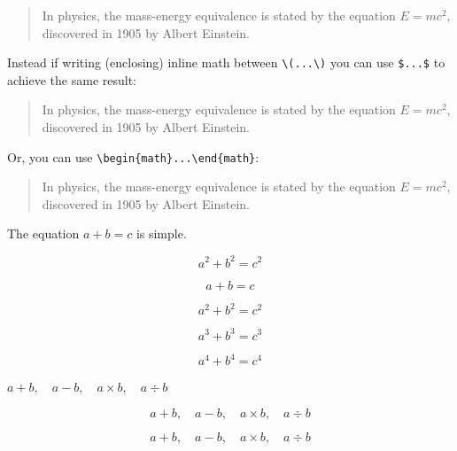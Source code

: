 \documentclass[12pt, letterpaper]{article}
\begin{document}
\begin{quote}
In physics, the mass-energy equivalence is stated 
by the equation \(E=mc^2\), discovered in 1905 by Albert Einstein.
\end{quote}

\noindent Instead if writing (enclosing) inline math between \verb|\(...\)| you can use \texttt{\$...\$} to achieve the same result:

\begin{quote}
In physics, the mass-energy equivalence is stated 
by the equation $E=mc^2$, discovered in 1905 by Albert Einstein.
\end{quote}

\noindent Or, you can use \verb|\begin{math}...\end{math}|:

\begin{quote}
In physics, the mass-energy equivalence is stated 
by the equation \begin{math}E=mc^2\end{math}, discovered in 1905 by Albert Einstein.
\end{quote}








\newpage

The equation $a + b = c$ is simple.

\[ a^2 + b^2 = c^2\]


\begin{equation}
	a + b = c
\end{equation}

\begin{equation}
a^2 + b^2 = c^2
\end{equation}

\begin{equation}
	a^3 + b^3 = c^3
\end{equation}

\begin{equation}
a^4 + b^4 = c^4
\end{equation}

$
a + b,\quad a - b,\quad a \times b,\quad a \div b
$


\[
a + b,\quad a - b,\quad a \times b,\quad a \div b
\]


\[
a + b,\quad 
a - b,\quad 
a \times b,\quad 
a \div b
\]
\end{document}
